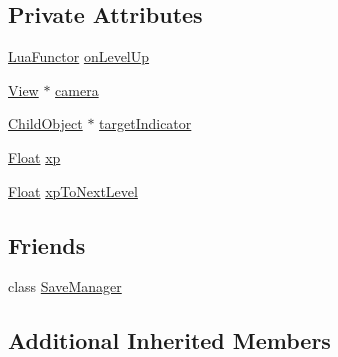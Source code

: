 \subsection*{Private Attributes}
\begin{DoxyCompactItemize}
\item 
\hyperlink{classZeta_1_1LuaFunctor}{Lua\+Functor} \hyperlink{classZeta_1_1Player_a514a6c8dab45dc80d2c8cfc3ad472345}{on\+Level\+Up}
\item 
\hyperlink{classZeta_1_1View}{View} $\ast$ \hyperlink{classZeta_1_1Player_a6c696154bc9063a4ec37dc76ddae56e3}{camera}
\item 
\hyperlink{classZeta_1_1ChildObject}{Child\+Object} $\ast$ \hyperlink{classZeta_1_1Player_a50f0a0349f1969acae952aada0ae16d6}{target\+Indicator}
\item 
\hyperlink{namespaceZeta_a1e0a1265f9b3bd3075fb0fabd39088ba}{Float} \hyperlink{classZeta_1_1Player_ac438ac12c1f3996494083d2fc6e351bc}{xp}
\item 
\hyperlink{namespaceZeta_a1e0a1265f9b3bd3075fb0fabd39088ba}{Float} \hyperlink{classZeta_1_1Player_a47b3afa0d89ecca9f1cd50174d8f549e}{xp\+To\+Next\+Level}
\end{DoxyCompactItemize}
\subsection*{Friends}
\begin{DoxyCompactItemize}
\item 
class \hyperlink{classZeta_1_1Player_a77fe9d9f64cee2f5d94d306baf7b6a8d}{Save\+Manager}
\end{DoxyCompactItemize}
\subsection*{Additional Inherited Members}


